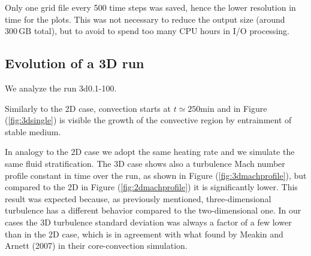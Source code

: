 	Only one grid file every 500 time steps was saved, hence the lower resolution in time for the plots. This was not necessary to reduce the output size (around $300 \, \mathrm{GB}$ total), but to avoid to spend too many CPU hours in I/O processing.


\subsection{Evolution of a 3D run}

We analyze the run 3d0.1-100.

Similarly to the 2D case, convection starts at $t \simeq 250 \mathrm{min}$ and in Figure (\ref{fig:3dsingle}) is visible the growth of the convective region by entrainment of stable medium.

In analogy to the 2D case we adopt the same heating rate and we simulate the same fluid stratification. The 3D case shows also a turbulence Mach number profile constant in time over the run, as shown in Figure (\ref{fig:3dmachprofile}), but compared to the 2D in Figure (\ref{fig:2dmachprofile}) it is significantly lower. This result was expected because, as previously mentioned, three-dimensional turbulence has a different behavior compared to the two-dimensional one. In our cases the 3D turbulence standard deviation was always a factor of a few lower than in the 2D case, which is in agreement with what found by Meakin and Arnett (2007) in their core-convection simulation. 

